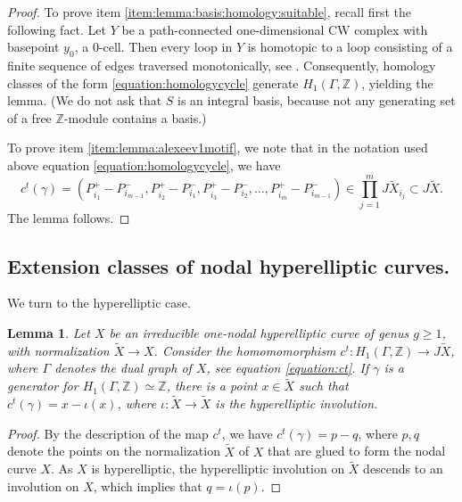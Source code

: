 \documentclass[a4paper,11pt,reqno]{amsart}
\numberwithin{equation}{section}
\theoremstyle{plain}
\newtheorem{lemma}[theorem]{Lemma}
\theoremstyle{definition}
\newcommand{\Z}{\mathbb Z}
\newcommand{\wt}[1]{{\widetilde{#1}}}
\renewcommand{\cong}{\simeq}
\begin{document}
 
\begin{proof}
To prove item \eqref{item:lemma:basis:homology:suitable}, recall first the following fact. Let $Y$ be a path-connected one-dimensional CW complex with basepoint $y_0$, 
a $0$-cell. Then every loop in $Y$ is homotopic to a loop consisting of a finite sequence of
edges traversed monotonically, see \cite[Section 1.1, Exercise 19]{hatcher-AT}. Consequently, homology classes of the form \eqref{equation:homologycycle} generate $H_1(\Gamma,\Z)$, yielding the lemma. 
(We do not ask that $S$ is an integral basis, because not any generating set of a free $\Z$-module contains a basis.) 

To prove item \eqref{item:lemma:alexeev1motif}, we note that in the notation used above equation \eqref{equation:homologycycle}, we have
\[
c^t(\gamma) = \left( 
P^+_{i_1} - P^-_{i_{m-1}}, P^+_{i_2} - P^-_{i_1}, P^+_{i_3} - P^-_{i_2}, \dotsc, P^+_{i_{m}} - P^-_{i_{m-1}}
\right) 
\in \prod_{j = 1}^m J \wt X_{i_j} \subset J \wt X.
\]
The lemma follows.   
\end{proof} 

 
\subsection{Extension classes of nodal hyperelliptic curves.}

We turn to the hyperelliptic case.  

\begin{lemma} \label{lemma:hyper-extension}
    Let $X$ be an irreducible one-nodal hyperelliptic curve of genus $g \geq 1$, with normalization $\wt X \to X$. Consider the homomomorphism $c^t \colon H_1(\Gamma,\Z) \to J\wt X$, where $\Gamma$ denotes the dual graph of $X$, see equation \eqref{equation:ct}. If $\gamma$ is a generator for $H_1(\Gamma,\Z) \cong \Z$, there is a point $x \in \wt X$ such that $c^t(\gamma) = x - \iota(x)$, where $\iota \colon \wt X \to \wt X$ is the hyperelliptic involution. 
\end{lemma}

\begin{proof}
By the description of the map $c^t$, we have $c^t(\gamma) = p-q$, where $p,q$ denote the points on the normalization $\wt X$ of $X$ that are glued to form the nodal curve $X$.
As $X$ is hyperelliptic, the hyperelliptic involution on $\wt X$ descends to an involution on $X$, which implies that $q=\iota(p)$.
\end{proof}
\end{document}
